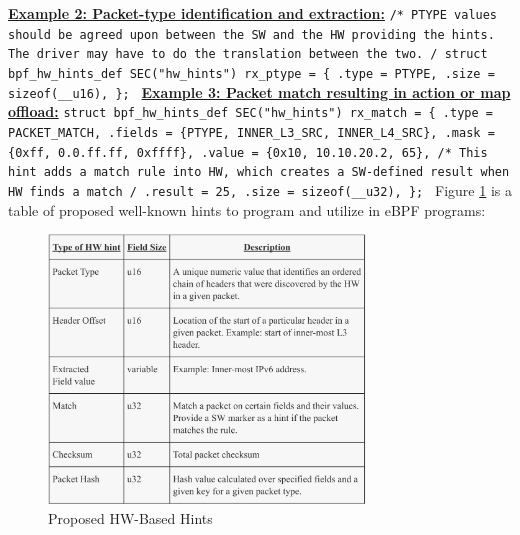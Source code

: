 \documentclass[letterpaper]{article}
\begin{document}
\newline
\newline
\textbf{\underline{Example 2: Packet-type identification and extraction:}}
\newline
\newline
{\scriptsize \texttt{/* PTYPE values should be agreed upon between the
\newline
\space \space * SW and the HW providing the hints. The driver
\newline
\space \space * may have to do the translation between the two.
\newline
\space \space */
\newline
struct bpf\_hw\_hints\_def SEC("hw\_hints") rx\_ptype = \{
\newline
\indent .type = PTYPE,
\newline
\indent .size = sizeof(\_\_u16),
\newline
\};
}}
\newline
\newline
\textbf{\underline{Example 3: Packet match resulting in action or map offload:}}
\newline
\newline
{\scriptsize \texttt{struct bpf\_hw\_hints\_def SEC("hw\_hints") rx\_match = \{
\newline
\indent .type = PACKET\_MATCH,
\newline
\indent .fields = \{PTYPE, INNER\_L3\_SRC, INNER\_L4\_SRC\},
\newline
\indent .mask = \{0xff, 0.0.ff.ff, 0xffff\},
\newline
\indent .value = \{0x10, 10.10.20.2, 65\},
\newline
\indent /* This hint adds a match rule into HW, which creates a
\newline
\indent \space * SW-defined result when HW finds a match
\newline
\indent \space */
\newline
\indent .result = 25,
\newline
\indent .size = sizeof(\_\_u32),
\newline
\};
}}
\newline
\newline
\indent Figure \ref{xdp-hint-types} is a table of proposed well-known hints to program and utilize in eBPF programs:

\begin{figure}[h]
\includegraphics[width=3.31in]{xdp-hint-types.png}
\caption{Proposed HW-Based Hints}
\label{xdp-hint-types}
\end{figure}
\end{document}
